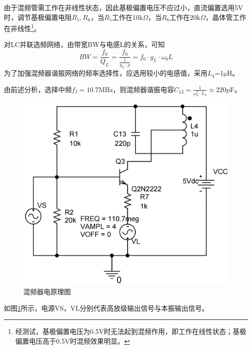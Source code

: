 \documentclass[a4paper,12pt,twoside]{article}
\begin{document}
由于混频管需工作在非线性状态，因此基极偏置电压不应过小，直流偏置选用5V时，调节基极偏置电阻$R_{5},R_{6}$，当$R_{5}$工作在10$\mathrm{k}\Omega$，当$R_{6}$工作在20$\mathrm{k}\Omega$，晶体管工作在非线性\footnote{经测试，基极偏置电压为0.5V时无法起到混频作用，即工作在线性状态；基极偏置电压高于0.5V时混频效果明显。}。

对LC并联选频网络，由带宽BW与电感L的关系，可知
\begin{equation}
    BW=\frac{f_0}{Q_L}=\frac{f_0}{\frac{1}{g_L \cdot \rho}}=f_0 \cdot g_L \cdot \omega_0 L
    \label{带宽}
\end{equation}
为了加强混频器谐振网络的频率选择性，应选用较小的电感值，采用$L_4$=1$\mathrm{\mu}$H。

由前述分析，选择中频$f_I=10.7$MHz，则混频器谐振电容$C_{13}=\frac{1}{\omega_0^2\cdot L_4}\approx220$pF。


\begin{figure}[H]
    \centering
    \includegraphics[scale=0.16]{混频电路已调参.png}
    \caption{混频器电原理图}
    \label{混频原理}
\end{figure}
如图\ref{混频原理}所示，电源VS，VL分别代表高放级输出信号与本振输出信号。
\end{document}
